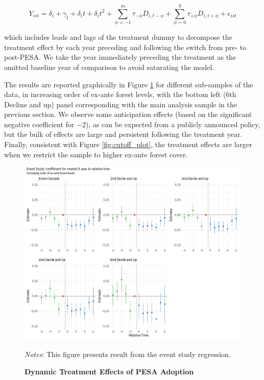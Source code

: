 \documentclass[12pt,reqno]{article}
\begin{document}
\begin{equation}\label{granger}
 Y_{ist} = \delta_i + \gamma_t + \delta_it + \delta_it^2  +
\sum_{\phi=-1}^m \tau_{-\phi}
D_{i, t - \phi} + \sum_{\phi=0}^q \tau_{+\phi} D_{i,t+\phi}
+ \epsilon_{ist}   
\end{equation}

 which includes leads and lags of the treatment dummy to decompose the treatment effect by each year preceding and following the switch from pre- to post-PESA. We take the year immediately preceding the treatment as the omitted baseline year of comparison to avoid saturating the model.
 
 The results are reported graphically in Figure \ref{fig:autor_plot} for different sub-samples of the data, in increasing order of ex-ante forest levels, with the bottom left (6th Decline and up) panel corresponding with the main analysis sample in the previous section.  We observe some anticipation effects (based on the significant negative coefficient for $-2$), as can be expected from a publicly announced policy, but the bulk of effects are large and persistent following the treatment year. Finally, consistent with Figure \ref{fig:cutoff_plot}, the treatment effects are larger when we restrict the sample to higher ex-ante forest cover.

\begin{figure}[htbp!]
\begin{center}
\begin{minipage}{1 \linewidth}
\caption{\textbf{Dynamic Treatment Effects of PESA Adoption} \label{fig:autor_plot}} 	
\centerline{\includegraphics[width=7.5 in,angle=0]{Output/Dyn_treat_eff_big.pdf}}
\smallskip
\scriptsize
\emph{Notes}: This figure presents result from the event study regression.
\end{minipage}
\end{center}
\end{figure}
\end{document}
